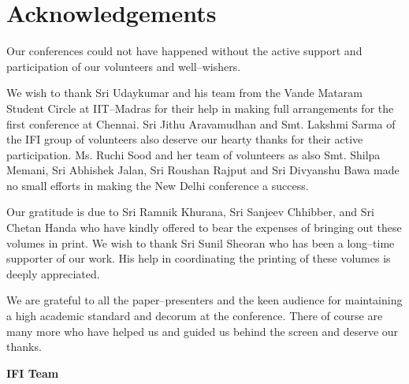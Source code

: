 
\chapter*{Acknowledgements}

Our conferences could not have happened without the active support and participation of our volunteers and well–wishers.

We wish to thank Sri Udaykumar and his team from the Vande Mataram Student Circle at IIT–Madras for their help in making full arrangements for the first conference at Chennai. Sri Jithu Aravamudhan and Smt. Lakshmi Sarma of the IFI group of volunteers also deserve our hearty thanks for their active participation. Ms. Ruchi Sood and her team of volunteers as also Smt. Shilpa Memani, Sri Abhishek Jalan, Sri Roushan Rajput and Sri Divyanshu Bawa made no small efforts in making the New Delhi conference a success.

Our gratitude is due to Sri Ramnik Khurana, Sri Sanjeev Chhibber, and Sri Chetan Handa who have kindly offered to bear the expenses of bringing out these volumes in print. We wish to thank Sri Sunil Sheoran who has been a long–time supporter of our work. His help in coordinating the printing of these volumes is deeply appreciated.

We are grateful to all the paper–presenters and the keen audience for maintaining a high academic standard and decorum at the conference. There of course are many more who have helped us and guided us behind the screen and deserve our thanks.

\begin{flushright}
 \textbf{IFI Team}
\end{flushright}

